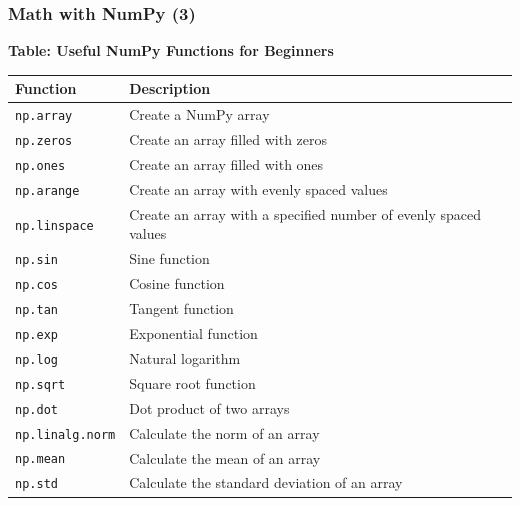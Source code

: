 \begin{frame}[fragile]
  \frametitle{Math with NumPy (3)}
  \textbf{Table: Useful NumPy Functions for Beginners}

  \begin{tabular}{l|l}
  Function & Description \\
  \hline
  \lstinline$np.array$ & Create a NumPy array \\
  \lstinline$np.zeros$ & Create an array filled with zeros \\
  \lstinline$np.ones$ & Create an array filled with ones \\
  \lstinline$np.arange$ & Create an array with evenly spaced values \\
  \lstinline$np.linspace$ & Create an array with a specified number of evenly spaced values \\
  \lstinline$np.sin$ & Sine function \\
  \lstinline$np.cos$ & Cosine function \\
  \lstinline$np.tan$ & Tangent function \\
  \lstinline$np.exp$ & Exponential function \\
  \lstinline$np.log$ & Natural logarithm \\
  \lstinline$np.sqrt$ & Square root function \\
  \lstinline$np.dot$ & Dot product of two arrays \\
  \lstinline$np.linalg.norm$ & Calculate the norm of an array \\
  \lstinline$np.mean$ & Calculate the mean of an array \\
  \lstinline$np.std$ & Calculate the standard deviation of an array \\
  \end{tabular}
\end{frame}


